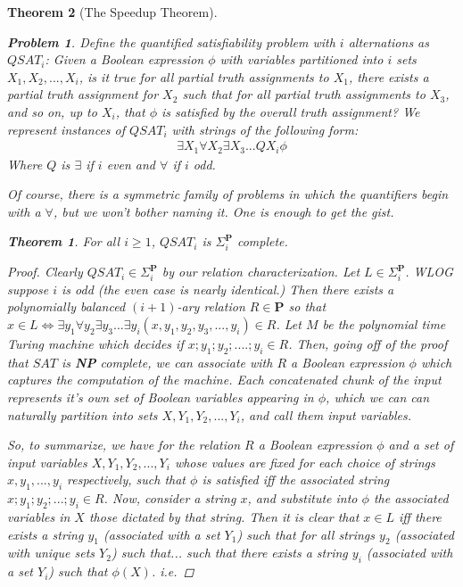 \documentclass{article}
\theoremstyle{definition}
\newtheorem{problem}{Problem}
\theoremstyle{plain}
\theoremstyle{theorem}
\newtheorem{theorem}{Theorem}[section]
\begin{document}
\begin{theorem}[The Speedup Theorem]
\begin{problem}
    Define \textit{the quantified satisfiability problem with $i$ alternations} as\\
    $QSAT_i$: Given a Boolean expression $\phi$ with variables partitioned into $i$ sets $X_1,X_2,...,X_i$, is it true for all partial truth assignments to $X_1$, there exists a partial truth assignment for $X_2$ such that for all partial truth assignments to $X_3$, and so on, up to $X_i$, that $\phi$ is satisfied by the overall truth assignment? We represent instances of $QSAT_i$ with strings of the following form:
    \begin{align}
        \exists X_1 \forall X_2 \exists X_3... QX_i \phi
    \end{align}
    Where $Q$ is $\exists$ if $i$ even and $\forall$ if $i$ odd.
\end{problem}
Of course, there is a symmetric family of problems in which the quantifiers begin with a $\forall$, but we won't bother naming it. One is enough to get the gist.
\begin{theorem}
    For all $i \geq 1$, $QSAT_i$ is $\Sigma_i^{\textbf{P}}$ complete.
\end{theorem}
\begin{proof}
    Clearly $QSAT_i \in \Sigma_i^{\textbf{P}}$ by our relation characterization.
    Let $L \in \Sigma_i^{\textbf{P}}$. WLOG suppose $i$ is odd (the even case is nearly identical.) Then there exists a polynomially balanced $(i+1)$-ary relation $R \in \textbf{P}$ so that $x \in L \iff \exists y_1 \forall y_2 \exists y_3 ... \exists y_i(x,y_1,y_2,y_3,...,y_i) \in R$. Let $M$ be the polynomial time Turing machine which decides if $x;y_1;y_2;....;y_i \in R$. Then, going off of the proof that $SAT$ is \textbf{NP} complete, we can associate with $R$ a Boolean expression $\phi$ which captures the computation of the machine. Each concatenated chunk of the input represents it's own set of Boolean variables appearing in $\phi$, which we can can naturally partition into sets $X,Y_1,Y_2,...,Y_i$, and call them \textit{input variables}.
    \par So, to summarize, we have for the relation $R$ a Boolean expression $\phi$ and a set of input variables $X,Y_1,Y_2,...,Y_i$ whose values are fixed for each choice of strings $x,y_1,...,y_i$ respectively, such that $\phi$ is satisfied iff the associated string $x;y_1;y_2;...;y_i \in R$. Now, consider a string $x$, and substitute into $\phi$ the associated variables in $X$ those dictated by that string. Then it is clear that $x \in L$ iff there exists a string $y_1$ (associated with a set $Y_1$) such that for all strings $y_2$ (associated with unique sets $Y_2$) such that... such that there exists a string $y_i$ (associated with a set $Y_i$) such that $\phi(X)$. i.e. 

\end{proof}
\end{theorem}
\end{document}
